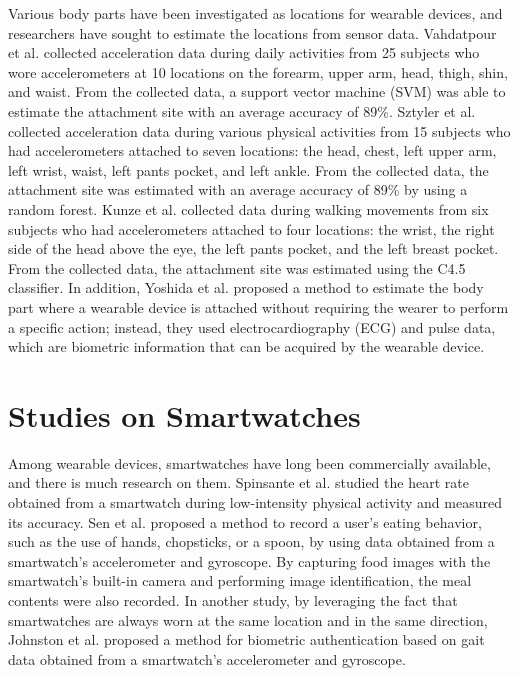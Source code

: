Various body parts have been investigated as locations for wearable devices, and researchers have sought to estimate the locations from sensor data. Vahdatpour et al. \cite{localization_vahdatpour} collected acceleration data during daily activities from 25 subjects who wore accelerometers at 10 locations on the forearm, upper arm, head, thigh, shin, and waist. From the collected data, a support vector machine (SVM) was able to estimate the attachment site with an average accuracy of 89\%. Sztyler et al. \cite{localization_sztyler} collected acceleration data during various physical activities from 15 subjects who had accelerometers attached to seven locations: the head, chest, left upper arm, left wrist, waist, left pants pocket, and left ankle. From the collected data, the attachment site was estimated with an average accuracy of 89\% by using a random forest. Kunze et al. \cite{localization_kunze} collected data during walking movements from six subjects who had accelerometers attached to four locations: the wrist, the right side of the head above the eye, the left pants pocket, and the left breast pocket. From the collected data, the attachment site was estimated using the C4.5 classifier. In addition, Yoshida et al. \cite{localization_yoshida} proposed a method to estimate the body part where a wearable device is attached without requiring the wearer to perform a specific action; instead, they used electrocardiography (ECG) and pulse data, which are biometric information that can be acquired by the wearable device.


\section{Studies on Smartwatches}
Among wearable devices, smartwatches have long been commercially available, and there is much research on them. Spinsante et al. \cite{accuracy_in_low_intensity} studied the heart rate obtained from a smartwatch during low-intensity physical activity and measured its accuracy. Sen et al. \cite{eating_recognition} proposed a method to record a user's eating behavior, such as the use of hands, chopsticks, or a spoon, by using data obtained from a smartwatch's accelerometer and gyroscope. By capturing food images with the smartwatch's built-in camera and performing image identification, the meal contents were also recorded. In another study, by leveraging the fact that smartwatches are always worn at the same location and in the same direction, Johnston et al. \cite{smartwatch_walk_authentication} proposed a method for biometric authentication based on gait data obtained from a smartwatch's accelerometer and gyroscope.\par

